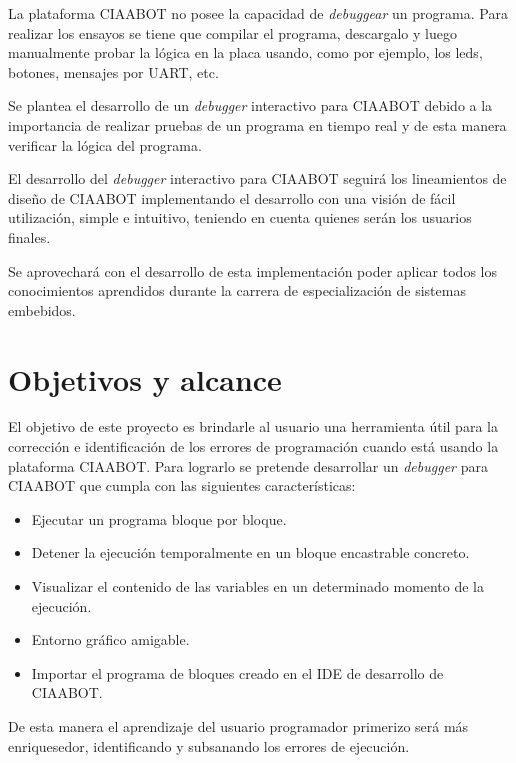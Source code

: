 La plataforma CIAABOT no posee la capacidad de \emph{debuggear} un programa.
Para realizar los ensayos se tiene que compilar el programa, descargalo y luego manualmente probar la lógica en la placa usando, como por ejemplo, los leds, botones, mensajes por UART, etc.

Se plantea el desarrollo de un \emph{debugger} interactivo para CIAABOT debido a la
importancia de realizar pruebas de un programa en tiempo real y de esta manera verificar la lógica del programa.

El desarrollo del \emph{debugger} interactivo para CIAABOT seguirá los lineamientos
de diseño de CIAABOT implementando el desarrollo con una visión de
fácil utilización, simple e intuitivo, teniendo en cuenta quienes serán los usuarios
finales.

Se aprovechará con el desarrollo de esta implementación poder aplicar todos los
conocimientos aprendidos durante la carrera de especialización de sistemas embebidos.



\section{Objetivos y alcance}
\label{Objetivos y alcance}

El objetivo de este proyecto es brindarle al usuario una herramienta útil para la
corrección e identificación de los errores de programación cuando está usando
la plataforma CIAABOT. Para lograrlo se pretende desarrollar un \emph{debugger} para
CIAABOT que cumpla con las siguientes características: 

\begin{itemize}
	\item Ejecutar un programa bloque por bloque.
	\item Detener la ejecución temporalmente en un bloque encastrable concreto.
	\item Visualizar el contenido de las variables en un determinado momento de la
	ejecución.
	\item Entorno gráfico amigable.
	\item Importar el programa de bloques creado en el IDE de desarrollo de CIAABOT.	
\end{itemize}

De esta manera el aprendizaje del usuario programador primerizo será más enriquesedor,
identificando y subsanando los errores de ejecución.








